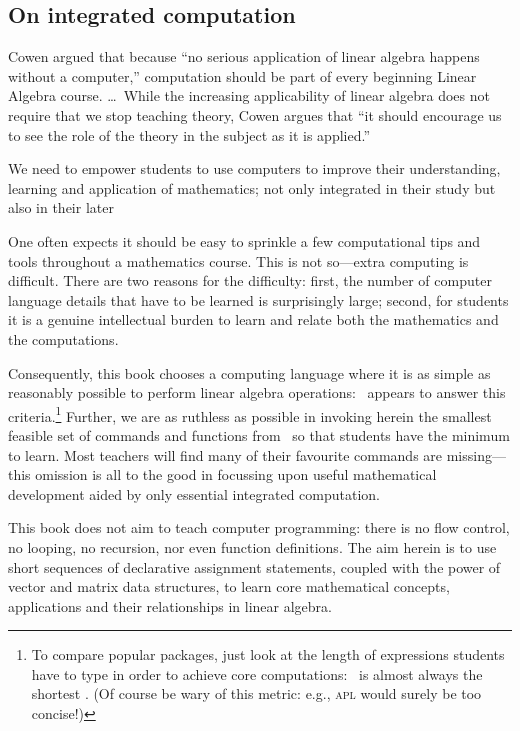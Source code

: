 \subsection*{On integrated computation}

\begin{quoted}{\cite{CUPMguide2015}}%
Cowen argued that because ``no serious application of linear algebra happens without a computer,'' computation should be part of every beginning Linear Algebra course. \ldots\
While the increasing applicability of linear algebra does not require that we stop teaching theory, Cowen argues that ``it should encourage us to see the role of the theory in the subject as it is applied.''
\end{quoted}


We need to empower students to use computers to improve their understanding, learning and application of mathematics; not only integrated in their study but also in their later 

One often expects it should be easy to sprinkle a few computational tips and tools throughout a mathematics course.
This is not so---extra computing is difficult.
There are two reasons for the difficulty: 
first, the number of computer language details that have to be learned is surprisingly large;
second, for students it is a genuine intellectual burden to learn and relate both the mathematics and the computations.

Consequently, this book chooses a computing language where it is as simple as reasonably possible to perform linear algebra operations: \script\ appears to answer this criteria.\footnote{To compare popular packages, just look at the length of expressions students have to type in order to achieve core computations: \script\ is almost always the shortest \cite[e.g.]{Nakos1998}.  
(Of course be wary of this metric: e.g., \textsc{apl} would surely be too concise!)}
Further, we are as ruthless as possible in invoking herein the smallest feasible set of commands and functions from \script\ so that  students have the minimum to learn.
Most teachers will find many of their favourite commands are missing---this omission is all to the good in focussing upon useful mathematical development aided by only essential integrated computation.

This book does not aim to teach computer programming: there is no flow control, no looping, no recursion, nor even function definitions.
The aim herein is to use short sequences of declarative assignment statements, coupled with the power of vector and matrix data structures, to learn core mathematical concepts, applications and their relationships in linear algebra. 

